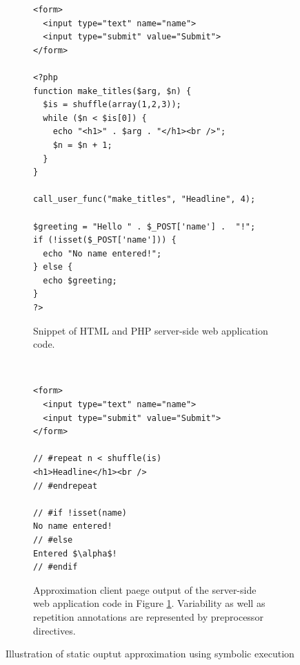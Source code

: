 \documentclass[sigconf]{acmart}
\begin{document}
\begin{figure}[t]
	\centering
	\begin{subfigure}[center]{0.48\textwidth}%
\begin{lstlisting}
<form>
  <input type="text" name="name">
  <input type="submit" value="Submit">
</form>

<?php
function make_titles($arg, $n) {
  $is = shuffle(array(1,2,3));
  while ($n < $is[0]) {
    echo "<h1>" . $arg . "</h1><br />";
    $n = $n + 1;
  }
}
  
call_user_func("make_titles", "Headline", 4);

$greeting = "Hello " . $_POST['name'] .  "!";
if (!isset($_POST['name'])) {
  echo "No name entered!";
} else {
  echo $greeting;
}
?>
\end{lstlisting}
		\caption{Snippet of HTML and PHP server-side web application code.
		\label{fig:web_application}}
    \end{subfigure}

	\vspace{2mm}    
    
    ~ %
    \begin{subfigure}[center]{0.48\textwidth}
\begin{lstlisting}[mathescape]
<form>
  <input type="text" name="name">
  <input type="submit" value="Submit">
</form>

// #repeat n < shuffle(is)
<h1>Headline</h1><br />
// #endrepeat

// #if !isset(name)
No name entered!
// #else
Entered $\alpha$!
// #endif

\end{lstlisting}
		\caption{
			Approximation client paege output of the server-side web application code in
			Figure \ref{fig:web_application}. Variability as well as repetition annotations
			are represented by preprocessor directives.
			\label{fig:output_example}
		}
    \end{subfigure}
    \vspace{2mm}
    \caption{
    	Illustration of static ouptut approximation using symbolic
    	execution
    	\label{fig:code_example}
    }
\end{figure}
\end{document}

